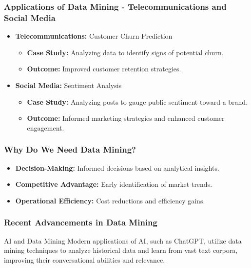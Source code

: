 \documentclass[aspectratio=169]{beamer}
\begin{document}
\begin{frame}[fragile]
    \frametitle{Applications of Data Mining - Telecommunications and Social Media}
    \begin{itemize}
        \item \textbf{Telecommunications:} Customer Churn Prediction
        \begin{itemize}
            \item \textbf{Case Study:} Analyzing data to identify signs of potential churn.
            \item \textbf{Outcome:} Improved customer retention strategies.
        \end{itemize}

        \item \textbf{Social Media:} Sentiment Analysis
        \begin{itemize}
            \item \textbf{Case Study:} Analyzing posts to gauge public sentiment toward a brand.
            \item \textbf{Outcome:} Informed marketing strategies and enhanced customer engagement.
        \end{itemize}
    \end{itemize}
\end{frame}

\begin{frame}[fragile]
    \frametitle{Why Do We Need Data Mining?}
    \begin{itemize}
        \item \textbf{Decision-Making:} Informed decisions based on analytical insights.
        \item \textbf{Competitive Advantage:} Early identification of market trends.
        \item \textbf{Operational Efficiency:} Cost reductions and efficiency gains.
    \end{itemize}
\end{frame}

\begin{frame}[fragile]
    \frametitle{Recent Advancements in Data Mining}
    \begin{block}{AI and Data Mining}
        Modern applications of AI, such as ChatGPT, utilize data mining techniques to analyze historical data and learn from vast text corpora, improving their conversational abilities and relevance.
    \end{block}
\end{frame}
\end{document}

